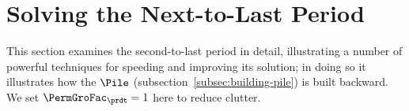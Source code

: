\documentclass[SolvingMicroDSOPs]{subfiles}
\begin{document}
\hypertarget{solving-the-next-to-last-period}{}
\hypertarget{solving-the-next}{}
\section{Solving the Next-to-Last Period}\label{sec:solving-the-next}

This section examines the second-to-last period in detail, illustrating a number of powerful techniques for speeding and improving its solution; in doing so it illustrates how the {\pileName} $\Pile$ (subsection~\ref{subsec:building-pile}) is built backward. We set $\PermGroFac_{\prdt}=1$ here to reduce clutter.  

\end{document}
